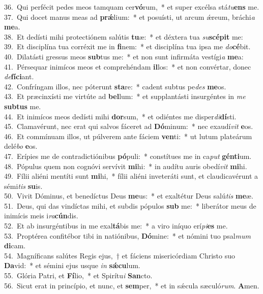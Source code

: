 {36.~}Qui perfécit pedes meos tamquam cer\textbf{vó}rum,~* et super excélsa stá\textit{tu}\textbf{ens} me.\\
{37.~}Qui docet manus meas ad \textbf{prǽ}lium:~* et posuísti, ut arcum ǽreum, bráchi\textit{a} \textbf{me}a.\\
{38.~}Et dedísti mihi protectiónem salútis \textbf{tu}æ:~* et déxtera tua \textit{su}\textbf{scé}\textbf{pit} me:\\
{39.~}Et disciplína tua corréxit me in \textbf{fi}nem:~* et disciplína tua ipsa me \textit{do}\textbf{cé}bit.\\
{40.~}Dilatásti gressus meos \textbf{sub}tus me:~* et non sunt infirmáta vestígi\textit{a} \textbf{me}a:\\
{41.~}Pérsequar inimícos meos et comprehéndam \textbf{il}los:~* et non convértar, donec \textit{de}\textbf{fí}\textbf{ci}ant.\\
{42.~}Confríngam illos, nec póterunt \textbf{sta}re:~* cadent subtus pe\textit{des} \textbf{me}os.\\
{43.~}Et præcinxísti me virtúte ad \textbf{bel}lum:~* et supplantásti insurgéntes in \textit{me} \textbf{sub}\textbf{tus} me.\\
{44.~}Et inimícos meos dedísti mihi \textbf{dor}sum,~* et odiéntes me disper\textit{di}\textbf{dí}sti.\\
{45.~}Clamavérunt, nec erat qui salvos fáceret ad \textbf{Dó}minum:~* nec exaudí\textit{vit} \textbf{e}os.\\
{46.~}Et commínuam illos, ut púlverem ante fáciem \textbf{ven}ti:~* ut lutum plateárum delé\textit{bo} \textbf{e}os.\\
{47.~}Erípies me de contradictiónibus \textbf{pó}puli:~* constítues me in ca\textit{put} \textbf{gén}\textbf{ti}um.\\
{48.~}Pópulus quem non cognóvi servívit \textbf{mi}hi:~* in audítu auris obedí\textit{vit} \textbf{mi}hi.\\
{49.~}Fílii aliéni mentíti sunt \textbf{mi}hi,~* fílii aliéni inveteráti sunt, et claudicavérunt a sémi\textit{tis} \textbf{su}is.\\
{50.~}Vivit Dóminus, et benedíctus Deus \textbf{me}us:~* et exaltétur Deus salú\textit{tis} \textbf{me}æ.\\
{51.~}Deus, qui das vindíctas mihi, et subdis pópulos \textbf{sub} me:~* liberátor meus de inimícis meis i\textit{ra}\textbf{cún}dis.\\
{52.~}Et ab insurgéntibus in me exal\textbf{tá}bis me:~* a viro iníquo erí\textit{pi}\textbf{es} me.\\
{53.~}Proptérea confitébor tibi in natiónibus, \textbf{Dó}mine:~* et nómini tuo psal\textit{mum} \textbf{di}cam.\\
{54.~}Magníficans salútes Regis ejus,~† et fáciens misericórdiam Christo suo \textbf{Da}vid:~* et sémini ejus usque \textit{in} \textbf{sǽ}\textbf{cu}lum.\\
{55.~}Glória Patri, et \textbf{Fí}lio,~* et Spirítu\textit{i} \textbf{San}cto.\\
{56.~}Sicut erat in princípio, et nunc, et \textbf{sem}per,~* et in sǽcula sæculó\textit{rum}. \textbf{A}men.\\
